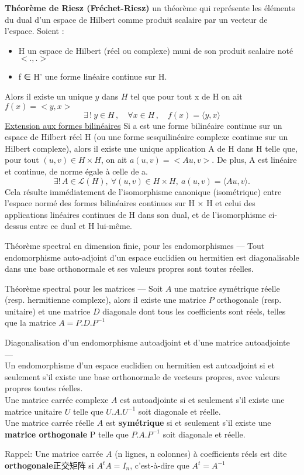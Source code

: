 \textbf{Th\'eor\`eme de Riesz (Fr\'echet-Riesz)}\newline
un th\'eor\`eme qui repr\'esente les \'el\'ements du dual d'un espace de Hilbert comme produit scalaire par un vecteur de l'espace.
Soient :
\begin{itemize}
		\item H un espace de Hilbert (r\'eel ou complexe) muni de son produit scalaire not\'e $<.,.>$
		\item f ∈ H' une forme lin\'eaire continue sur H.
\end{itemize}
Alors il existe un unique $y$ dans $H$ tel que pour tout x de H on ait $f(x) = <y, x>$
$$
\exists\,!\ y \in H\,, \quad \forall x\in H\,, \quad f(x) = \langle y,x\rangle
$$
\underline{Extension aux formes bilin\'eaires}\newline
Si a est une forme bilin\'eaire continue sur un espace de Hilbert r\'eel H (ou une forme sesquilin\'eaire complexe continue sur un Hilbert complexe), alors il existe une unique application A de H dans H telle que, pour tout $(u, v) \in H \times H$, on ait $a(u, v) = <Au, v>$. De plus, A est lin\'eaire et continue, de norme \'egale \`a celle de a.
$$
\exists !\,A\in\mathcal{L}(H),\ \forall (u,v)\in H\times H,\ a(u,v)=\langle Au,v \rangle.
$$
Cela r\'esulte imm\'ediatement de l'isomorphisme canonique (isom\'etrique) entre l'espace norm\'e des formes bilin\'eaires continues sur H × H et celui des applications lin\'eaires continues de H dans son dual, et de l'isomorphisme ci-dessus entre ce dual et H lui-m\^eme.
\bigskip

\begin{theorem}
Th\'eor\`eme spectral en dimension finie, pour les endomorphismes —  Tout endomorphisme auto-adjoint d'un espace euclidien ou hermitien est diagonalisable dans une base orthonormale et ses valeurs propres sont toutes r\'eelles.

Th\'eor\`eme spectral pour les matrices —  Soit $A$ une matrice sym\'etrique r\'eelle (resp. hermitienne complexe), alors il existe une matrice $P$ orthogonale (resp. unitaire) et une matrice $D$ diagonale dont tous les coefficients sont r\'eels, telles que la matrice $A = P.D.P^{-1}$
\end{theorem}

\begin{theorem}
Diagonalisation d'un endomorphisme autoadjoint et d'une matrice autoadjointe — \\
Un endomorphisme d'un espace euclidien ou hermitien est autoadjoint si et seulement s'il existe une base orthonormale de vecteurs propres, avec valeurs propres toutes r\'eelles.\\
Une matrice carr\'ee complexe $A$ est autoadjointe si et seulement s'il existe une matrice unitaire $U$ telle que $U.A.U^{-1}$ soit diagonale et r\'eelle.\\
Une matrice carr\'ee r\'eelle $A$ est \textbf{sym\'etrique} si et seulement s'il existe une \textbf{matrice orthogonale} P telle que $P.A.P^{-1}$ soit diagonale et r\'eelle.
\end{theorem}
Rappel:
Une matrice carr\'ee $A$ (n lignes, n colonnes) \`a coefficients r\'eels est dite \textbf{orthogonale}正交矩阵 si $A^t A = I_n$, c'est-\`a-dire que $A^t = A^{-1}$

